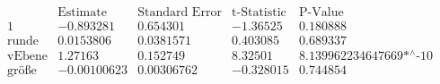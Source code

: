 \[\begin{array}{l|llll}
 \text{} & \text{Estimate} & \text{Standard Error} & \text{t-Statistic} & \text{P-Value} \\
\hline
 1 & -0.893281 & 0.654301 & -1.36525 & 0.180888 \\
 \text{runde} & 0.0153806 & 0.0381571 & 0.403085 & 0.689337 \\
 \text{vEbene} & 1.27163 & 0.152749 & 8.32501 & \text{8.139962234647669$\grave{ }$*${}^{\wedge}$-10} \\
 \text{gr{\" o}{\ss}e} & -0.00100623 & 0.00306762 & -0.328015 & 0.744854 \\
\end{array}\]

